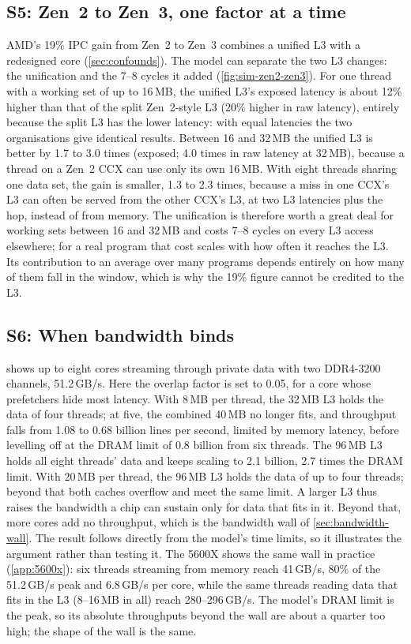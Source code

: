 \subsection{S5: Zen~2 to Zen~3, one factor at a time}
\label{sec:sim-zen2-zen3}
AMD's 19\% IPC gain from Zen~2 to Zen~3 combines a unified L3 with a redesigned core (\cref{sec:confounds}). The model can separate the two L3 changes: the unification and the 7--8 cycles it added (\cref{fig:sim-zen2-zen3}). For one thread with a working set of up to 16\,MB, the unified L3's exposed latency is about 12\% higher than that of the split Zen~2-style L3 (20\% higher in raw latency), entirely because the split L3 has the lower latency: with equal latencies the two organisations give identical results. Between 16 and 32\,MB the unified L3 is better by 1.7 to 3.0 times (exposed; 4.0 times in raw latency at 32\,MB), because a thread on a Zen~2 CCX can use only its own 16\,MB. With eight threads sharing one data set, the gain is smaller, 1.3 to 2.3 times, because a miss in one CCX's L3 can often be served from the other CCX's L3, at two L3 latencies plus the hop, instead of from memory. The unification is therefore worth a great deal for working sets between 16 and 32\,MB and costs 7--8 cycles on every L3 access elsewhere; for a real program that cost scales with how often it reaches the L3. Its contribution to an average over many programs depends entirely on how many of them fall in the window, which is why the 19\% figure cannot be credited to the L3.



\subsection{S6: When bandwidth binds}
\label{sec:sim-bandwidth}
 shows up to eight cores streaming through private data with two DDR4-3200 channels, 51.2\,GB/s. Here the overlap factor is set to 0.05, for a core whose prefetchers hide most latency. With 8\,MB per thread, the 32\,MB L3 holds the data of four threads; at five, the combined 40\,MB no longer fits, and throughput falls from 1.08 to 0.68 billion lines per second, limited by memory latency, before levelling off at the DRAM limit of 0.8 billion from six threads. The 96\,MB L3 holds all eight threads' data and keeps scaling to 2.1 billion, 2.7 times the DRAM limit. With 20\,MB per thread, the 96\,MB L3 holds the data of up to four threads; beyond that both caches overflow and meet the same limit. A larger L3 thus raises the bandwidth a chip can sustain only for data that fits in it. Beyond that, more cores add no throughput, which is the bandwidth wall of \cref{sec:bandwidth-wall}. The result follows directly from the model's time limits, so it illustrates the argument rather than testing it. The 5600X shows the same wall in practice (\cref{app:5600x}): six threads streaming from memory reach 41\,GB/s, 80\% of the 51.2\,GB/s peak and 6.8\,GB/s per core, while the same threads reading data that fits in the L3 (8--16\,MB in all) reach 280--296\,GB/s. The model's DRAM limit is the peak, so its absolute throughputs beyond the wall are about a quarter too high; the shape of the wall is the same.

